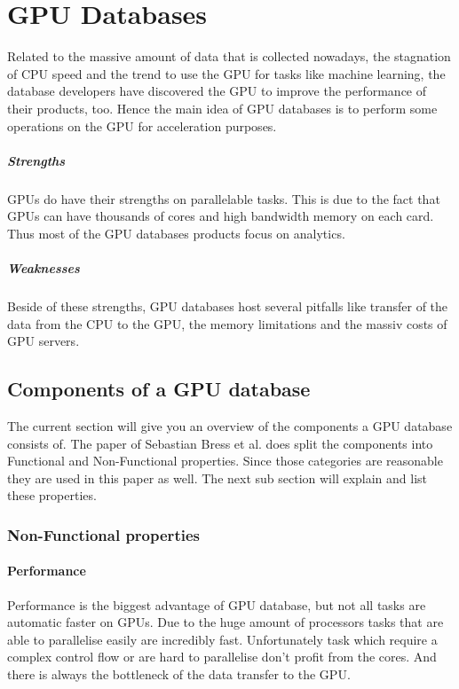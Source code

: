 \chapter{GPU Databases}
Related to the massive amount of data that is collected nowadays, the stagnation of CPU speed
and the trend to use the GPU for tasks like machine learning, the database developers have discovered the GPU to improve the performance of their products, too.
Hence the main idea of GPU databases is to perform some operations on the GPU for acceleration purposes.

\paragraph{Strengths}
GPUs do have their strengths on parallelable tasks.
This is due to the fact that GPUs can have thousands of cores and high bandwidth memory on each card.
Thus most of the GPU databases products focus on analytics.


\paragraph{Weaknesses} Beside of these strengths, GPU databases host several pitfalls like transfer of the data from the CPU to the GPU,
 the memory limitations and the massiv costs of GPU servers.


\section{Components of a GPU database}
The current section will give you an overview of the components a GPU database consists of.
The paper \cite{bress2014gpu} of Sebastian Bress et al. does split the components into Functional and Non-Functional properties.
Since those categories are reasonable they are used in this paper as well.
The next sub section will explain and list these properties.

\subsection{Non-Functional properties}

\subsubsection{Performance}
Performance is the biggest advantage of GPU database, but not all tasks are automatic faster on GPUs.
Due to the huge amount of processors tasks that are able to parallelise easily are incredibly fast.
Unfortunately task which require a complex control flow or are hard to parallelise don't profit from the cores.
And there is always the bottleneck of the data transfer to the GPU.

